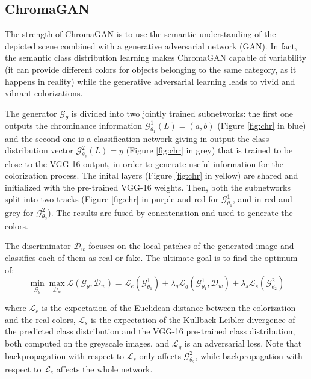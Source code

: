 \subsection{ChromaGAN}
The strength of ChromaGAN is to use the semantic understanding of the depicted scene combined with a generative
adversarial network (GAN). In fact, the semantic class distribution learning makes ChromaGAN capable of
variability (it can provide different colors for objects belonging to the same category, as it happens in reality)
while the generative adversarial learning leads to vivid and vibrant colorizations.

The generator $\mathcal{G}_\theta$ is divided into two jointly trained subnetworks: the first one outputs the chrominance information $\mathcal{G}_{\theta_1}^1(L) = (a,b)$ (Figure \ref{fig:chr} in blue) and the second one is a classification network giving in output the class distribution vector $\mathcal{G}_{\theta_2}^2(L)=y$ (Figure \ref{fig:chr} in grey) that is trained to be close to the VGG-16 output, in order to generate useful information for the colorization process. The inital layers (Figure \ref{fig:chr} in yellow) are shared and initialized with the pre-trained VGG-16 weights. Then, both the subnetworks split into two tracks (Figure \ref{fig:chr} in purple and red for $\mathcal{G}_{\theta_1}^1$, and in red and grey for $\mathcal{G}_{\theta_2}^2$). The results are fused by concatenation and used to generate the colors.

The discriminator $\mathcal{D}_w$ focuses on the local patches of the generated image and classifies each of them as real or fake. The ultimate goal is to find the optimum of:
\begin{equation*}
	\min_{\mathcal{G}_\theta}\max_{\mathcal{D}_w} \mathcal{L}(\mathcal{G}_\theta, \mathcal{D}_w) = \mathcal{L}_e(\mathcal{G}^1_{\theta_1}) + \lambda_g\mathcal{L}_g(\mathcal{G}^1_{\theta_1},\mathcal{D}_w) + \lambda_s\mathcal{L}_s(\mathcal{G}^2_{\theta_2})
\end{equation*} 

where $\mathcal{L}_e$ is the expectation of the Euclidean distance between the colorization and the real colors,
$\mathcal{L}_s$ is the expectation of the Kullback-Leibler divergence of the predicted class distribution and the
VGG-16 pre-trained class distribution, both computed on the greyscale images, and $\mathcal{L}_g$ is an adversarial loss. Note that backpropagation with respect to $\mathcal{L}_s$ only affects $\mathcal{G}_{\theta_2}^2$, while backpropagation with respect to $\mathcal{L}_e$ affects the whole network.